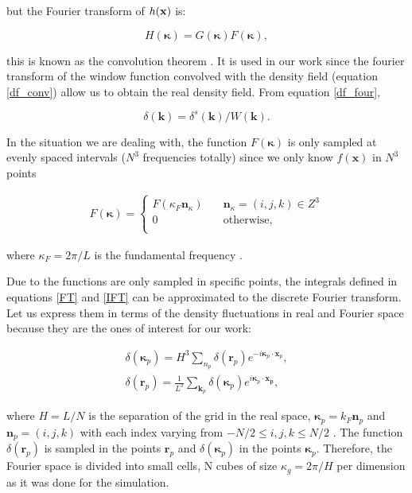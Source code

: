 but the Fourier transform of $h(\bf{x})$ is: 

\[H(\boldsymbol{\kappa}) = G(\boldsymbol{\kappa}) F(\boldsymbol{\kappa}),  \]

this is known as the convolution theorem \cite{Djeong}. It is used in our work since the fourier 
transform of the window function convolved with the density field (equation \ref{df_conv})
allow us to obtain the real density field. From equation \ref{df_four}, 

\[\delta(\textbf{k}) = \delta^s(\textbf{k})/W(\textbf{k}).\]

In the situation we are dealing with, the function $F(\boldsymbol{\kappa})$ is only
sampled at evenly spaced intervals ($N^3$ frequencies totally) since we only 
know $f(\textbf{x})$ in $N^3$ points

\begin{eqnarray*}
F(\boldsymbol{\kappa}) =\left\{ \begin{array}{cl}
F(\kappa_F\boldsymbol{n}_\kappa) \hspace{1em} & \boldsymbol{n}_\kappa = (i,j,k) \in Z^3\\
0 \hspace{1em} & \mathrm{otherwise,} \\
\end{array}\right.
\end{eqnarray*} 

where $\kappa_F=2\pi/L$ is the fundamental frequency \cite{Djeong}.

Due to the functions are only sampled in specific points, the integrals defined in 
equations \ref{FT} and \ref{IFT} can be approximated to the discrete Fourier transform. 
Let us express them in terms of the density fluctuations in real and Fourier space 
because they are the ones of interest for our work: 

\begin{eqnarray*}
\delta(\boldsymbol{\kappa}_p) = H^3 \sum_{n_p} \delta(\boldsymbol{r}_p) e^{-i\boldsymbol{\kappa}_p\cdot \boldsymbol{x}_p}, \\
\delta(\boldsymbol{r}_p) = \frac{1}{L^3}\sum_{\boldsymbol{k}_p} \delta(\boldsymbol{\kappa}_p) e^{i\boldsymbol{\kappa}_p\cdot \boldsymbol{x_p}}, 
\end{eqnarray*} 

where $H = L/N$ is the separation of the grid in the real space, 
$\boldsymbol{\kappa}_p = k_F \textbf{n}_p$ and $ \boldsymbol{n}_p = (i,j,k)$ with each index
varying from $-N/2 \leq i,j,k \leq N/2$ . The function $\delta(\boldsymbol{r}_p)$  is sampled 
in the points $\boldsymbol{r}_p$ and $\delta(\boldsymbol{\kappa}_p)$ in the points 
$\boldsymbol{\kappa}_p$. Therefore, the Fourier space is divided into small cells, N cubes of size 
$\kappa_g = 2\pi/H$ per dimension as it was done for the simulation. 

